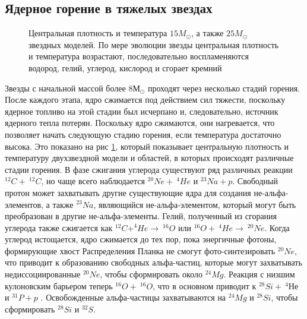 \documentclass[%
master,    %
natbib,      %
subf,        %
href,        %
colorlinks,  %
]{disser}
\begin{document}
\subsection{Ядерное горение в тяжелых звездах}

\begin{figure}[h]
	\caption{Центральная плотность и температура $15M_\odot$, а также $25M_\odot$ звездных моделей. По мере эволюции звезды центральная плотность и температура возрастают, последовательно воспламеняются водород, гелий, углерод, кислород и сгорает кремний \cite{massive}}
	\label{ris:massive}
\end{figure}

Звезды с начальной массой более $8 М_\odot$ проходят через несколько стадий горения. После каждого этапа, ядро сжимается под действием сил тяжести, поскольку ядерное топливо на этой стадии был исчерпано и, следовательно, источник ядерного тепла потерян. Поскольку ядро сжимаются, они нагревается, что позволяет начать следующую стадию горения, если температура достаточно высока. Это показано на рис \ref{ris:massive}, который показывает центральную плотность и температуру двухзвездной модели и областей, в которых происходят различные стадии горения. В фазе сжигания углерода существуют ряд различных реакции $^{12}C + \ ^{12}C$, но чаще всего наблюдается $^{20}Ne + \ ^{4}He$ и $^{23}Na + p$. Свободный протон может захватывать другие существующие ядра для создания не-альфа-элементов, а также $^{23}Na$, являющийся не-альфа-элементом, который могут быть преобразован в другие не-альфа-элементы. Гелий, полученный из сгорания углерода также сжигается как $^{12}C + ^{4}He \rightarrow \ ^{16}O$ или $^{16}O + \ ^{4}He \rightarrow \ ^{20}Ne$. Когда углерод истощается, ядро сжимается до тех пор, пока энергичные фотоны, формирующие хвост Распределения Планка не смогут фото-синтезировать $^{20}Ne$, что приводит к образованию свободных альфа-частиц, которые могут захватывать недиссоциированные $^{20}Ne$, чтобы сформировать около $^{24}Mg$. Реакция с низшим кулоновским барьером теперь $^{16}O + \ ^{16}O$, что в основном приводит к $^{28}Si + \ ^4Не$ и $^{31}P + p$ \cite{cauldrons}. Освобожденные альфа-частицы захватываются на $^{24}Mg$ и $^{28}Si$, чтобы сформировать $^{28}Si$ и $^{32}S$.
\end{document}
